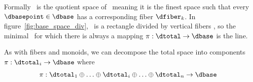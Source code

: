 \documentclass[../main.tex]{subfiles}
\begin{document}
Formally \dbase\ is the quotient space \cite{QuotientSpaceTopology2020} of \dtotal\, meaning it is the finest space\cite{aurouxMath131Introduction} such that every $\dbasepoint \in \dbase$ has a corresponding fiber $\dfiber_k$\cite{QuotientSpaceTopology2020}. In figure~\ref{fig:base_space_div}, \dtotal\ is a rectangle divided by vertical fibers \dfiber, so the minimal \dbase\ for which there is always a mapping $\pi: \dtotal\rightarrow \dbase$ is the line. 

As with fibers and monoids, we can decompose the total space into components $\pi:\dtotal_i\rightarrow \dbase$ where
\begin{equation}
    \pi:\dtotal_1\oplus\ldots\oplus \dtotal_i \oplus\ldots \oplus \dtotal_n \rightarrow \dbase
\end{equation}
\end{document}
